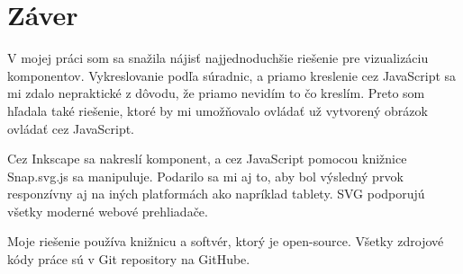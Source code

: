 \chapter*{Záver}

V mojej práci som sa snažila nájisť najjednoduchšie riešenie pre vizualizáciu komponentov. Vykreslovanie podľa súradnic, a priamo kreslenie cez JavaScript sa mi zdalo nepraktické z dôvodu, že priamo nevidím to čo kreslím. Preto som hľadala také riešenie, ktoré by mi umožňovalo ovládať už vytvorený obrázok ovládať cez JavaScript. 

Cez Inkscape sa nakreslí komponent, a cez JavaScript pomocou knižnice Snap.svg.js sa manipuluje. Podarilo sa mi aj to, aby bol výsledný prvok responzívny aj na iných platformách ako napríklad tablety. SVG podporujú všetky moderné webové prehliadače.

Moje riešenie používa knižnicu a softvér, ktorý je open-source. Všetky zdrojové kódy práce sú v Git repository na GitHube. 